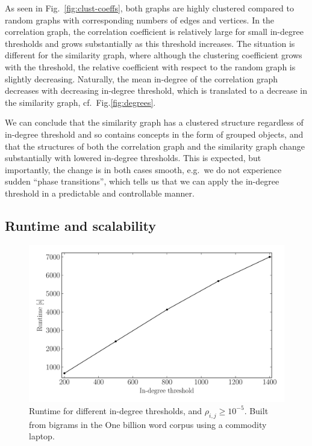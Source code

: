 \documentclass{kais}
\newcommand{\rn}[1]{\rho_{#1}}
\begin{document}
As seen in Fig.\ \ref{fig:clust-coeffs}, both graphs are highly clustered compared to random graphs with corresponding 
numbers of edges and vertices. In the correlation graph, the correlation coefficient is relatively large for small in-degree 
thresholds and grows substantially as this threshold increases. The situation is different for the similarity graph, where although the
clustering coefficient grows with the threshold, the relative coefficient with respect to the random graph is slightly decreasing.
Naturally, the mean in-degree of the correlation graph decreases with decreasing in-degree threshold,
which is translated to a decrease in the similarity graph, cf.\ Fig.\ref{fig:degrees}.

We can conclude that the similarity graph has a clustered structure regardless of in-degree threshold 
and so contains concepts in the form of grouped objects, and that the structures of both the correlation graph and the similarity graph change substantially with lowered in-degree thresholds. This is expected, but importantly, the change is in both cases smooth, e.g.\ we do not experience sudden ``phase transitions'', which tells us that we can apply the in-degree threshold in a predictable and controllable manner.

\subsection{Runtime and scalability}
\label{sec: scalability}

\begin{figure}
\centerline{\includegraphics[width=0.75\columnwidth]{figures/billion-rt-2.pdf}}
\caption{Runtime for different in-degree 
thresholds, and $\rn{i,j} \geq 10^{-5}$. Built from bigrams in the One billion word corpus using a commodity laptop.}
\label{fig:billion-e-runtime}
\end{figure}
\end{document}
